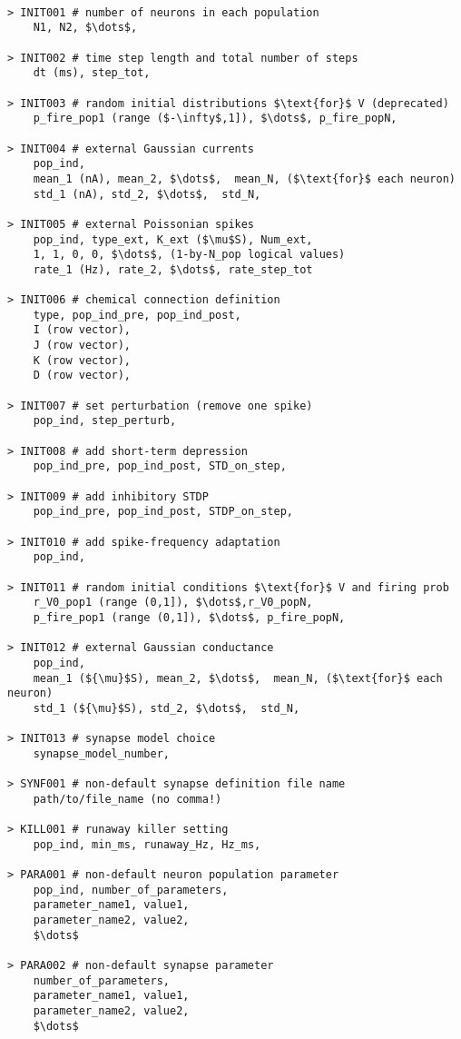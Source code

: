 \documentclass{article}
\begin{document}

\begin{lstlisting}[mathescape]

> INIT001 # number of neurons in each population
	N1, N2, $\dots$,

> INIT002 # time step length and total number of steps
	dt (ms), step_tot,

> INIT003 # random initial distributions $\text{for}$ V (deprecated)
	p_fire_pop1 (range ($-\infty$,1]), $\dots$, p_fire_popN, 

> INIT004 # external Gaussian currents
	pop_ind, 
	mean_1 (nA), mean_2, $\dots$,  mean_N, ($\text{for}$ each neuron)
	std_1 (nA), std_2, $\dots$,  std_N, 

> INIT005 # external Poissonian spikes
	pop_ind, type_ext, K_ext ($\mu$S), Num_ext,
	1, 1, 0, 0, $\dots$, (1-by-N_pop logical values)
	rate_1 (Hz), rate_2, $\dots$, rate_step_tot

> INIT006 # chemical connection definition
	type, pop_ind_pre, pop_ind_post,
	I (row vector),
	J (row vector),
	K (row vector),
	D (row vector),

> INIT007 # set perturbation (remove one spike)
	pop_ind, step_perturb,

> INIT008 # add short-term depression
	pop_ind_pre, pop_ind_post, STD_on_step,

> INIT009 # add inhibitory STDP
	pop_ind_pre, pop_ind_post, STDP_on_step,
	
> INIT010 # add spike-frequency adaptation 
	pop_ind,

> INIT011 # random initial conditions $\text{for}$ V and firing prob
	r_V0_pop1 (range (0,1]), $\dots$,r_V0_popN, 
	p_fire_pop1 (range (0,1]), $\dots$, p_fire_popN, 

> INIT012 # external Gaussian conductance
	pop_ind, 
	mean_1 (${\mu}$S), mean_2, $\dots$,  mean_N, ($\text{for}$ each neuron)
	std_1 (${\mu}$S), std_2, $\dots$,  std_N, 

> INIT013 # synapse model choice
	synapse_model_number,

> SYNF001 # non-default synapse definition file name
	path/to/file_name (no comma!)

> KILL001 # runaway killer setting
	pop_ind, min_ms, runaway_Hz, Hz_ms,

> PARA001 # non-default neuron population parameter
	pop_ind, number_of_parameters,
	parameter_name1, value1,
	parameter_name2, value2,
	$\dots$
 
> PARA002 # non-default synapse parameter
	number_of_parameters,
	parameter_name1, value1,
	parameter_name2, value2,
	$\dots$


\end{lstlisting}
\end{document}
